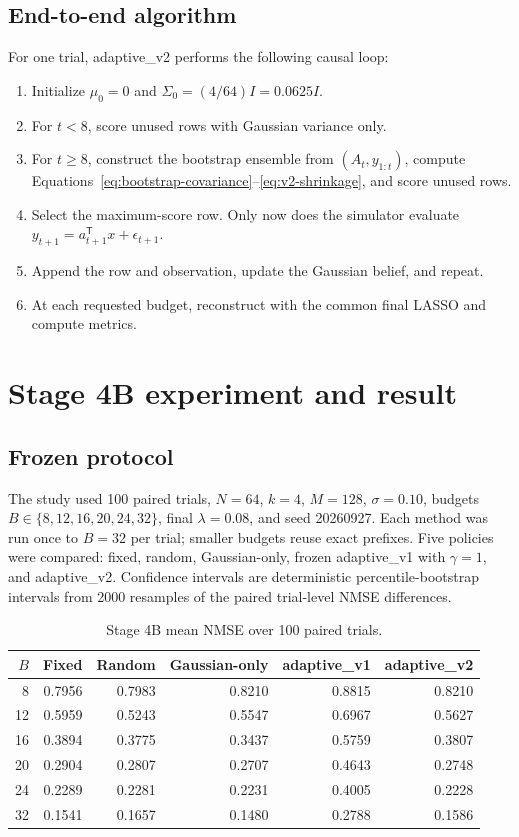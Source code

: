 \documentclass[11pt,a4paper]{article}
\newcommand{\trans}{^{\mathsf T}}
\begin{document}
\subsection{End-to-end algorithm}

For one trial, adaptive\_v2 performs the following causal loop:
\begin{enumerate}
\item Initialize $\mu_0=0$ and $\Sigma_0=(4/64)I=0.0625I$.
\item For $t<8$, score unused rows with Gaussian variance only.
\item For $t\geq8$, construct the bootstrap ensemble from $(A_t,y_{1:t})$, compute
      Equations~\eqref{eq:bootstrap-covariance}--\eqref{eq:v2-shrinkage}, and score unused rows.
\item Select the maximum-score row.  Only now does the simulator evaluate
      $y_{t+1}=a_{t+1}\trans x+\epsilon_{t+1}$.
\item Append the row and observation, update the Gaussian belief, and repeat.
\item At each requested budget, reconstruct with the common final LASSO and compute metrics.
\end{enumerate}

\section{Stage 4B experiment and result}

\subsection{Frozen protocol}

The study used 100 paired trials, $N=64$, $k=4$, $M=128$, $\sigma=0.10$, budgets
$B\in\{8,12,16,20,24,32\}$, final $\lambda=0.08$, and seed 20260927.  Each method was run
once to $B=32$ per trial; smaller budgets reuse exact prefixes.  Five policies were compared:
fixed, random, Gaussian-only, frozen adaptive\_v1 with $\gamma=1$, and adaptive\_v2.
Confidence intervals are deterministic percentile-bootstrap intervals from 2000 resamples of
the paired trial-level NMSE differences.

\begin{table}[htbp]
\centering
\caption{Stage 4B mean NMSE over 100 paired trials.}
\label{tab:stage4b}
\begin{tabular}{rrrrrr}
\hline
$B$ & Fixed & Random & Gaussian-only & adaptive\_v1 & adaptive\_v2 \\
\hline
8  & 0.7956 & 0.7983 & 0.8210 & 0.8815 & 0.8210 \\
12 & 0.5959 & 0.5243 & 0.5547 & 0.6967 & 0.5627 \\
16 & 0.3894 & 0.3775 & 0.3437 & 0.5759 & 0.3807 \\
20 & 0.2904 & 0.2807 & 0.2707 & 0.4643 & 0.2748 \\
24 & 0.2289 & 0.2281 & 0.2231 & 0.4005 & 0.2228 \\
32 & 0.1541 & 0.1657 & 0.1480 & 0.2788 & 0.1586 \\
\hline
\end{tabular}
\end{table}
\end{document}

